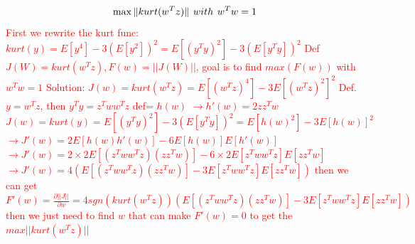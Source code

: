 \documentclass[a4 paper]{article}
\begin{document}
\begin{tcolorbox}[colback=RubineRed!5!white,colframe=RubineRed!75!black]
\begin{equation}
    \max \large\|kurt(w^Tz)\large\| \ with \ w^Tw=1
\end{equation}
\textcolor{red}{\newline First we rewrite the kurt func: $kurt(y)=E[y^4]-3(E[y^2])^2=E[(y^Ty)^2]-3(E[y^Ty])^2$\newline
Def $J(W)=kurt(w^Tz), F(w)=||J(W)||$, goal is to find $max(F(w))$ with $w^Tw=1$\newline
Solution: $J(w)=kurt(w^Tz)=E[(w^Tz)^4]-3E[(w^Tz)^2]^2$\newline
\hspace*{0.5cm} Def. $y=w^Tz$, then $y^Ty=z^Tww^Tz$ def= $h(w)$\newline
\hspace*{1cm} $\rightarrow h'(w)=2zz^Tw$\newline
\hspace*{0.5cm} $J(w)=kurt(y)=E[(y^Ty)^2]-3(E[y^Ty])^2=E[h(w)^2]-3E[h(w)]^2$\newline
\hspace*{1cm} $\rightarrow J'(w)=2E[h(w)h'(w)]-6E[h(w)]E[h'(w)]$\newline
\hspace*{1cm} $\rightarrow J'(w)=2\times 2E[(z^Tww^Tz)(zz^Tw)]-6\times 2E[z^Tww^Tz]E[zz^Tw]$\newline
\hspace*{1cm} $\rightarrow J'(w)=4(E[(z^Tww^Tz)(zz^Tw)]-3E[z^Tww^Tz]E[zz^Tw])$\newline
\hspace*{0.5cm} then we can get $F'(w)=\frac{\partial||J||}{\partial w}=4sgn(kurt(w^Tz))(E[(z^Tww^Tz)(zz^Tw)]-3E[z^Tww^Tz]E[zz^Tw])$\newline
\hspace*{0.5cm} then we just need to find $w$ that can make $F'(w)=0$ to get the $max||kurt(w^Tz)||$
}
\end{tcolorbox}
\end{document}
